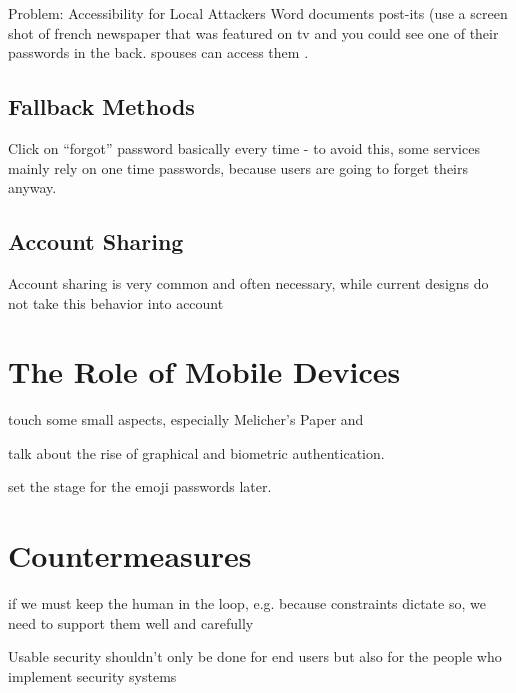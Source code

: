 	\cite{Conklin2004PWAuthenticationSystemPerspective}
	
	Problem: Accessibility for Local Attackers
Word documents post-its (use a screen shot of french newspaper that was featured on tv and you could see one of their passwords in the back. spouses can access them .	


	\subsection{Fallback Methods}
	Click on ``forgot'' password basically every time - to avoid this, some services mainly rely on one time passwords, because users are going to forget theirs anyway. 

	\cite{Bonneau2015SecretsLies}
	


	\subsection{Account Sharing}
	Account sharing is very common and often necessary, while current designs do not take this behavior into account \cite{Singh2007PasswordSharing}


\section{The Role of Mobile Devices}
touch some small aspects, especially Melicher's Paper \cite{Melicher2016UsabilityMobileTextPasswords} and \cite{VonZezschwitz2014HoneyIShrunkTheKeys}
\cite{Haque2014PsychometricsStrongPassword} 

talk about the rise of graphical and biometric authentication. 


set the stage for the emoji passwords later. 



\section{Countermeasures}

if we must keep the human in the loop, e.g. because constraints dictate so, we need to support them well and carefully \cite{Cranor2008FrameworkReasoning}

Usable security shouldn't only be done for end users but also for the people who implement security systems \cite{Acar2016NotYourDeveloper}


